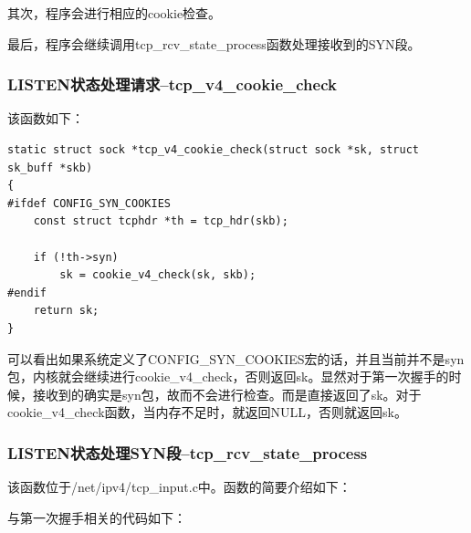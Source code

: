 \documentclass[11pt, a4paper,oneside]{book}
\theoremstyle{ocrenumbox}
\theoremstyle{purplenumbox}
\theoremstyle{blackbox}
\begin{document}
                其次，程序会进行相应的cookie检查。

                最后，程序会继续调用tcp\_rcv\_state\_process函数处理接收到的SYN段。
            
    \subsubsection{LISTEN状态处理请求--tcp\_v4\_cookie\_check}
                该函数如下：
\begin{verbatim}
static struct sock *tcp_v4_cookie_check(struct sock *sk, struct sk_buff *skb)
{
#ifdef CONFIG_SYN_COOKIES
    const struct tcphdr *th = tcp_hdr(skb);

    if (!th->syn)
        sk = cookie_v4_check(sk, skb);
#endif
    return sk;
}
\end{verbatim}

                可以看出如果系统定义了CONFIG\_SYN\_COOKIES宏的话，并且当前并不是syn包，内核就会继续进行cookie\_v4\_check，否则返回sk。显然对于第一次握手的时候，接收到的确实是syn包，故而不会进行检查。而是直接返回了sk。对于cookie\_v4\_check函数，当内存不足时，就返回NULL，否则就返回sk。
            \subsubsection{LISTEN状态处理SYN段--tcp\_rcv\_state\_process}
                该函数位于/net/ipv4/tcp\_input.c中。函数的简要介绍如下：

                与第一次握手相关的代码如下：
\end{document}
